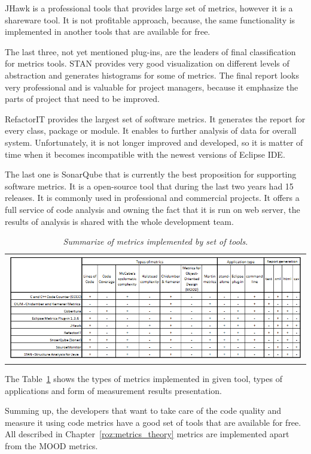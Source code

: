 JHawk is a professional tools that provides large set of metrics, however it is a shareware tool. It is not profitable approach, because, the same functionality is implemented in another tools that are available for free.      

The last three, not yet mentioned plug-ins, are the leaders of final classification for metrics tools. STAN provides very good visualization on different levels of abstraction and generates histograms for some of metrics. The final report looks very professional and is valuable for project managers, because it emphasize the parts of project that need to be improved.

RefactorIT provides the largest set of software metrics. It generates the report for every class, package or module. It enables to further analysis of data for overall system. Unfortunately, it is not longer improved and developed, so it is matter of time when it becomes incompatible with the newest versions of Eclipse \ac{IDE}. 

The last one is SonarQube that is currently the best proposition for supporting software metrics. It is a open-source tool that during the last two years had 15 releases. It is commonly used in professional and commercial projects. It offers a full service of code analysis and owning the fact that it is run on web server, the results of analysis is shared with the whole development team.  

\begin{table}[h!]
	\centering
	\begin{tabular}{l}
		\includegraphics[scale=0.7]{img/tools.png} \\
	\end{tabular}	
		\caption{\textit{Summarize of metrics implemented by set of tools.}}
		\label{tab:summarytools}
\end{table}

The Table~\ref{tab:summarytools} shows the types of metrics implemented in given tool, types of applications and form of measurement results presentation.

Summing up, the developers that want to take care of the code quality and measure it using code metrics have a good set of tools that are available for free.  All described in Chapter~\ref{roz:metrics_theory} metrics are implemented apart from the MOOD metrics. 
